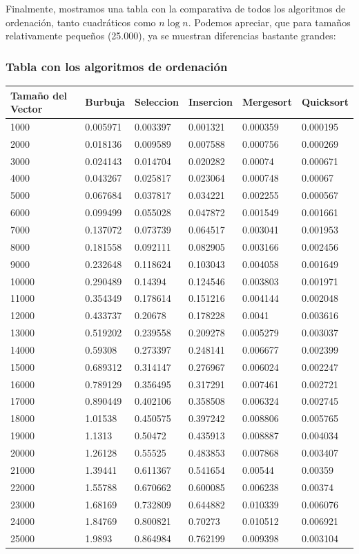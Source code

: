 \documentclass[]{article}
\begin{document}
Finalmente, mostramos una tabla con la comparativa de todos los
algoritmos de ordenación, tanto cuadráticos como \(n \log{n}\). Podemos
apreciar, que para tamaños relativamente pequeños (25.000), ya se
muestran diferencias bastante grandes:

\subsubsection{Tabla con los algoritmos de
ordenación}\label{tabla-con-los-algoritmos-de-ordenacion}

\begin{longtable}[c]{@{}llllll@{}}
\toprule
Tamaño del Vector & Burbuja & Seleccion & Insercion & Mergesort &
Quicksort\tabularnewline
\midrule
\endhead
1000 & 0.005971 & 0.003397 & 0.001321 & 0.000359 &
0.000195\tabularnewline
2000 & 0.018136 & 0.009589 & 0.007588 & 0.000756 &
0.000269\tabularnewline
3000 & 0.024143 & 0.014704 & 0.020282 & 0.00074 &
0.000671\tabularnewline
4000 & 0.043267 & 0.025817 & 0.023064 & 0.000748 &
0.00067\tabularnewline
5000 & 0.067684 & 0.037817 & 0.034221 & 0.002255 &
0.000567\tabularnewline
6000 & 0.099499 & 0.055028 & 0.047872 & 0.001549 &
0.001661\tabularnewline
7000 & 0.137072 & 0.073739 & 0.064517 & 0.003041 &
0.001953\tabularnewline
8000 & 0.181558 & 0.092111 & 0.082905 & 0.003166 &
0.002456\tabularnewline
9000 & 0.232648 & 0.118624 & 0.103043 & 0.004058 &
0.001649\tabularnewline
10000 & 0.290489 & 0.14394 & 0.124546 & 0.003803 &
0.001971\tabularnewline
11000 & 0.354349 & 0.178614 & 0.151216 & 0.004144 &
0.002048\tabularnewline
12000 & 0.433737 & 0.20678 & 0.178228 & 0.0041 & 0.003616\tabularnewline
13000 & 0.519202 & 0.239558 & 0.209278 & 0.005279 &
0.003037\tabularnewline
14000 & 0.59308 & 0.273397 & 0.248141 & 0.006677 &
0.002399\tabularnewline
15000 & 0.689312 & 0.314147 & 0.276967 & 0.006024 &
0.002247\tabularnewline
16000 & 0.789129 & 0.356495 & 0.317291 & 0.007461 &
0.002721\tabularnewline
17000 & 0.890449 & 0.402106 & 0.358508 & 0.006324 &
0.002745\tabularnewline
18000 & 1.01538 & 0.450575 & 0.397242 & 0.008806 &
0.005765\tabularnewline
19000 & 1.1313 & 0.50472 & 0.435913 & 0.008887 & 0.004034\tabularnewline
20000 & 1.26128 & 0.55525 & 0.483853 & 0.007868 &
0.003407\tabularnewline
21000 & 1.39441 & 0.611367 & 0.541654 & 0.00544 & 0.00359\tabularnewline
22000 & 1.55788 & 0.670662 & 0.600085 & 0.006238 &
0.00374\tabularnewline
23000 & 1.68169 & 0.732809 & 0.644882 & 0.010339 &
0.006076\tabularnewline
24000 & 1.84769 & 0.800821 & 0.70273 & 0.010512 &
0.006921\tabularnewline
25000 & 1.9893 & 0.864984 & 0.762199 & 0.009398 &
0.003104\tabularnewline
\bottomrule
\end{longtable}
\end{document}

